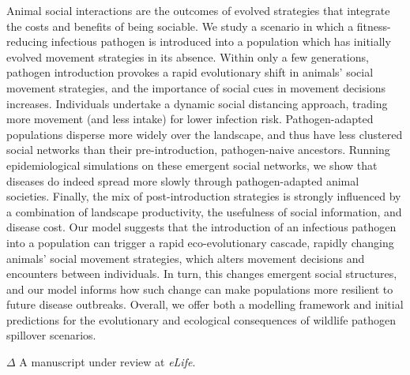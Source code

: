 {
    Animal social interactions are the outcomes of evolved strategies that integrate the costs and benefits of being sociable.
    We study a scenario in which a fitness-reducing infectious pathogen is introduced into a population which has initially evolved movement strategies in its absence.
    Within only a few generations, pathogen introduction provokes a rapid evolutionary shift in animals' social movement strategies, and the importance of social cues in movement decisions increases.
    Individuals undertake a dynamic social distancing approach, trading more movement (and less intake) for lower infection risk.
    Pathogen-adapted populations disperse more widely over the landscape, and thus have less clustered social networks than their pre-introduction, pathogen-naive ancestors.
    Running epidemiological simulations on these emergent social networks, we show that diseases do indeed spread more slowly through pathogen-adapted animal societies.
    Finally, the mix of post-introduction strategies is strongly influenced by a combination of landscape productivity, the usefulness of social information, and disease cost.
    Our model suggests that the introduction of an infectious pathogen into a population can trigger a rapid eco-evolutionary cascade, rapidly changing animals' social movement strategies, which alters movement decisions and encounters between individuals. 
    In turn, this changes emergent social structures, and our model informs how such change can make populations more resilient to future disease outbreaks.
    Overall, we offer both a modelling framework and initial predictions for the evolutionary and ecological consequences of wildlife pathogen spillover scenarios.

    \bigskip

    {\noindent \large{$\Delta$}} A manuscript under review at \textit{eLife}.
}

\clearpage